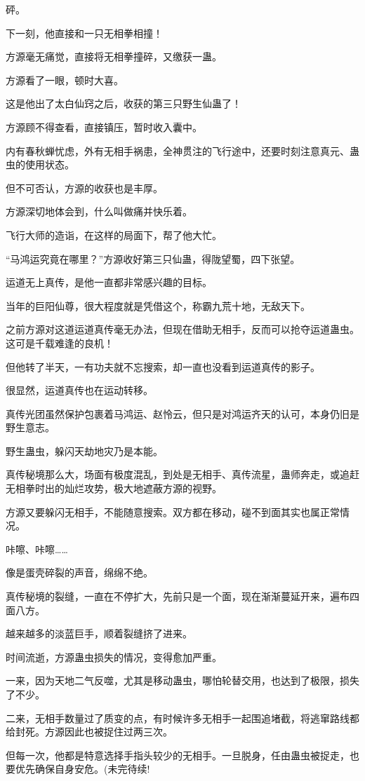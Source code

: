 \begin{this_body}
砰。

下一刻，他直接和一只无相拳相撞！

方源毫无痛觉，直接将无相拳撞碎，又缴获一蛊。

方源看了一眼，顿时大喜。

这是他出了太白仙窍之后，收获的第三只野生仙蛊了！

方源顾不得查看，直接镇压，暂时收入囊中。

内有春秋蝉忧虑，外有无相手祸患，全神贯注的飞行途中，还要时刻注意真元、蛊虫的使用状态。

但不可否认，方源的收获也是丰厚。

方源深切地体会到，什么叫做痛并快乐着。

飞行大师的造诣，在这样的局面下，帮了他大忙。

“马鸿运究竟在哪里？”方源收好第三只仙蛊，得陇望蜀，四下张望。

运道无上真传，是他一直都非常感兴趣的目标。

当年的巨阳仙尊，很大程度就是凭借这个，称霸九荒十地，无敌天下。

之前方源对这道运道真传毫无办法，但现在借助无相手，反而可以抢夺运道蛊虫。这可是千载难逢的良机！

但他转了半天，一有功夫就不忘搜索，却一直也没看到运道真传的影子。

很显然，运道真传也在运动转移。

真传光团虽然保护包裹着马鸿运、赵怜云，但只是对鸿运齐天的认可，本身仍旧是野生意志。

野生蛊虫，躲闪天劫地灾乃是本能。

真传秘境那么大，场面有极度混乱，到处是无相手、真传流星，蛊师奔走，或追赶无相拳时出的灿烂攻势，极大地遮蔽方源的视野。

方源又要躲闪无相手，不能随意搜索。双方都在移动，碰不到面其实也属正常情况。

咔嚓、咔嚓……

像是蛋壳碎裂的声音，绵绵不绝。

真传秘境的裂缝，一直在不停扩大，先前只是一个面，现在渐渐蔓延开来，遍布四面八方。

越来越多的淡蓝巨手，顺着裂缝挤了进来。

时间流逝，方源蛊虫损失的情况，变得愈加严重。

一来，因为天地二气反噬，尤其是移动蛊虫，哪怕轮替交用，也达到了极限，损失了不少。

二来，无相手数量过了质变的点，有时候许多无相手一起围追堵截，将逃窜路线都给封死。方源因此也被捉住过两三次。

但每一次，他都是特意选择手指头较少的无相手。一旦脱身，任由蛊虫被捉走，也要优先确保自身安危。(未完待续!

\end{this_body}

